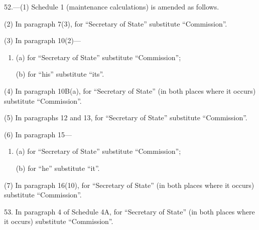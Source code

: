 \documentclass[a4paper]{article}
\begin{document}
\medskip

52.---(1) Schedule 1 (maintenance calculations) is amended as follows.

(2) In paragraph 7(3), for “Secretary of State” substitute “Commission”.

(3) In paragraph 10(2)—
\begin{enumerate}\item[]
(a) for “Secretary of State” substitute “Commission”;

(b) for “his” substitute “its”.
\end{enumerate}

(4) In paragraph 10B(a), for “Secretary of State” (in both places where it occurs) substitute “Commission”.

(5) In paragraphs 12 and 13, for “Secretary of State” substitute “Commission”.

(6) In paragraph 15—
\begin{enumerate}\item[]
(a) for “Secretary of State” substitute “Commission”;

(b) for “he” substitute “it”.
\end{enumerate}

(7) In paragraph 16(10), for “Secretary of State” (in both places where it occurs) substitute “Commission”.

\medskip

53. In paragraph 4 of Schedule 4A, for “Secretary of State” (in both places where it occurs) substitute “Commission”.


%
\end{document}
